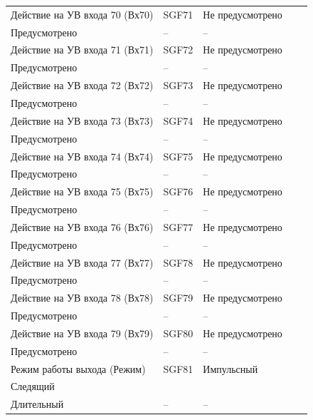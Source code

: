 \begin{longtable}{|>{\centering\arraybackslash}m{5.3cm}|>{\centering\arraybackslash}m{3.3cm}|>{\centering\arraybackslash}m{4.2cm}|>{\centering\arraybackslash}m{1.8cm}|>{\centering\arraybackslash}m{1cm}|}
\hline
\centering Действие на УВ входа 70 (Вх70)  & \centering SGF71 & \centering Не предусмотрено \\ Предусмотрено & \centering -- & \centering \arraybackslash -- \\
\hline
\centering Действие на УВ входа 71 (Вх71)  & \centering SGF72 & \centering Не предусмотрено \\ Предусмотрено & \centering -- & \centering \arraybackslash -- \\
\hline
\centering Действие на УВ входа 72 (Вх72)  & \centering SGF73 & \centering Не предусмотрено \\ Предусмотрено & \centering -- & \centering \arraybackslash -- \\
\hline
\centering Действие на УВ входа 73 (Вх73)  & \centering SGF74 & \centering Не предусмотрено \\ Предусмотрено & \centering -- & \centering \arraybackslash -- \\
\hline
\centering Действие на УВ входа 74 (Вх74)  & \centering SGF75 & \centering Не предусмотрено \\ Предусмотрено & \centering -- & \centering \arraybackslash -- \\
\hline
\centering Действие на УВ входа 75 (Вх75)  & \centering SGF76 & \centering Не предусмотрено \\ Предусмотрено & \centering -- & \centering \arraybackslash -- \\
\hline
\centering Действие на УВ входа 76 (Вх76)  & \centering SGF77 & \centering Не предусмотрено \\ Предусмотрено & \centering -- & \centering \arraybackslash -- \\
\hline
\centering Действие на УВ входа 77 (Вх77)  & \centering SGF78 & \centering Не предусмотрено \\ Предусмотрено & \centering -- & \centering \arraybackslash -- \\
\hline
\centering Действие на УВ входа 78 (Вх78)  & \centering SGF79 & \centering Не предусмотрено \\ Предусмотрено & \centering -- & \centering \arraybackslash -- \\
\hline
\centering Действие на УВ входа 79 (Вх79)  & \centering SGF80 & \centering Не предусмотрено \\ Предусмотрено & \centering -- & \centering \arraybackslash -- \\
\hline
\centering Режим работы выхода (Режим)  & \centering SGF81 & \centering Импульсный \\ Следящий \\ Длительный & \centering -- & \centering \arraybackslash -- \\

\end{longtable}
